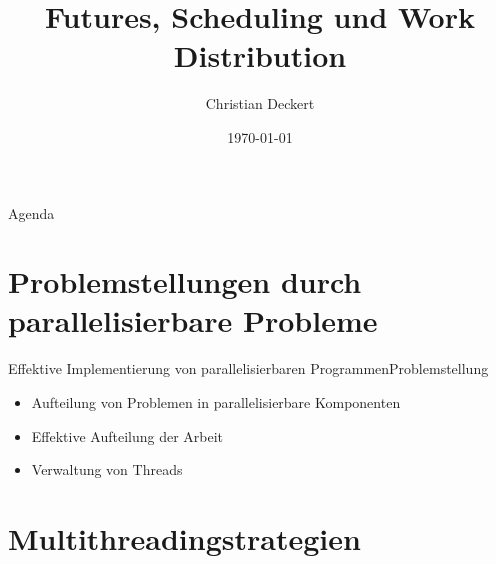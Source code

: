 \documentclass{beamer}
\title{Futures, Scheduling und Work Distribution}
\author{Christian Deckert}
\date{\today}
\institute{Universit\"at Mannheim}
\begin{document}
%
%
\maketitle

%
%
\begin{frame}{Agenda}
\tableofcontents[hideallsubsections]
\end{frame}


%
%
%
\section{Problemstellungen durch parallelisierbare Probleme}
%
%
\begin{frame}{Effektive Implementierung von parallelisierbaren Programmen}{Problemstellung}

\begin{itemize}
\item Aufteilung von Problemen in parallelisierbare Komponenten
\item Effektive Aufteilung der Arbeit
\item Verwaltung von Threads
\end{itemize}
\end{frame}


\section{Multithreadingstrategien}
\end{document}
